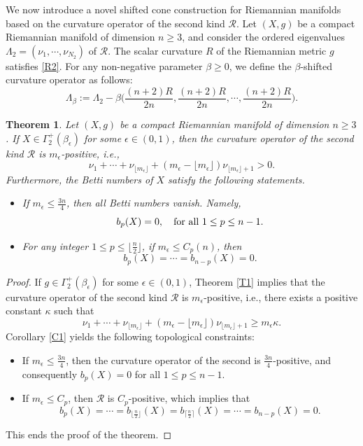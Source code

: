 \documentclass[12pt, twoside]{article}
\newtheorem{theorem}{Theorem}[section]
\theoremstyle{definition}
\numberwithin{equation}{section}
\def \b {\beta}
\begin{document}
We now introduce a novel shifted cone construction for Riemannian manifolds based on the curvature operator of the second kind $\mathcal{R}$. Let $(X,g)$ be a compact Riemannian manifold of dimension $n \geq 3$, and consider the ordered eigenvalues $\Lambda_{2}=(\nu_{1},\cdots,\nu_{N_{2}})$ of $\mathcal{R}$. The scalar curvature $R$ of the Riemannian metric $g$ satisfies \eqref{R2}. For any non-negative parameter $\beta\geq 0$, we define the $\beta$-shifted curvature operator as follows:
\begin{equation*}
\Lambda_{\beta}:=\Lambda_{2}-\b\Big(\frac{(n+2)R}{2n},\frac{(n+2)R}{2n},\cdots,\frac{(n+2)R}{2n}\Big).
\end{equation*}
\begin{theorem}\label{T4}
Let $(X,g)$ be a compact Riemannian manifold of dimension $n \geq 3$. If $X \in \Gamma^{+}_2(\beta_\epsilon)$ for some $\epsilon \in (0,1)$, then the curvature operator of the second kind $\mathcal{R}$ is $m_{\epsilon}$-positive, i.e., 
\begin{equation*}
\nu_1 + \cdots + \nu_{\lfloor m_{\epsilon} \rfloor} + (m_{\epsilon} - \lfloor m_{\epsilon} \rfloor)\nu_{\lfloor m_{\epsilon} \rfloor+1} > 0.
\end{equation*}
Furthermore, the Betti numbers of $X$ satisfy the following statements.
\begin{itemize}
\item[(i)]  If $m_{\epsilon} \leq \frac{3n}{4}$, then all Betti numbers vanish. Namely,
\begin{equation*}
b_p(X) = 0, \quad {\rm{for\ all}}\ 1 \leq p \leq n-1.
\end{equation*}
\item[(ii)]  For any integer $1 \leq p \leq \lfloor \frac{n}{2} \rfloor$, if $m_{\epsilon} \leq C_p(n)$, then
\begin{equation*}
b_p(X) = \cdots = b_{n-p}(X)=0.
\end{equation*}
\end{itemize}
\end{theorem}
\begin{proof}
If $g\in\Gamma^{+}_{2}(\beta_{\epsilon})$ for some $\epsilon\in(0,1)$,  Theorem \ref{T1} implies that the
curvature operator of the second kind $\mathcal{R}$ is $m_{\epsilon}$-positive, i.e., there exists a positive constant $\kappa$ such that
$$\nu_{1}+\cdots+\nu_{\lfloor m_{\epsilon}\rfloor}+(m_{\epsilon}-\lfloor m_{\epsilon}\rfloor)\nu_{\lfloor m_{\epsilon}\rfloor+1}\geq m_{\epsilon}\kappa.$$
Corollary \ref{C1} yields the following topological constraints:
\begin{itemize}
\item[(i)] If $m_{\epsilon}\leq\frac{3n}{4}$, then the curvature operator of the second is $\frac{3n}{4}$-positive, and consequently $b_{p}(X)=0$ for all $1\leq p\leq n-1$.
\item[(ii)] If $m_{\epsilon} \leq C_p$, then $\mathcal{R}$ is $C_p$-positive, which implies that  $$b_{p}(X)=\cdots=b_{\lfloor\frac{n}{2}\rfloor}(X)=b_{\lceil\frac{n}{2}\rceil}(X)=\cdots=b_{n-p}(X)=0.$$
\end{itemize}
This ends the proof of the theorem.
\end{proof}
\end{document}
